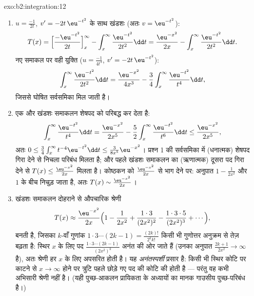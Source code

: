 \begin{solution}{exo:b2:integration:12}
\begin{enumerate}
  \item $u = \frac{-1}{2t}$, $v' = -2t\,\eu^{-t^2}$ के साथ खंडशः (अतः $v = \eu^{-t^2}$):
        \[
        T(x) = \Bigl[\frac{-\eu^{-t^2}}{2t}\Bigr]_x^\infty
        - \int_x^\infty \frac{\eu^{-t^2}}{2t^2}\dd t
        = \frac{\eu^{-x^2}}{2x}
        - \int_x^\infty \frac{\eu^{-t^2}}{2t^2}\dd t .
        \]
        नए समाकल पर वही युक्ति ($u = \frac{-1}{4t^3}$, $v' = -2t\,\eu^{-t^2}$):
        \[
        \int_x^\infty \frac{\eu^{-t^2}}{2t^2}\dd t
        = \frac{\eu^{-x^2}}{4x^3}
        - \frac34\int_x^\infty \frac{\eu^{-t^2}}{t^4}\dd t ,
        \]
        जिससे घोषित सर्वसमिका मिल जाती है।
  \item एक और खंडशः समाकलन शेषपद को परिबद्ध कर देता है:
        \[
        \int_x^\infty \frac{\eu^{-t^2}}{t^4}\dd t
        = \frac{\eu^{-x^2}}{2x^5}
        - \frac52\int_x^\infty\frac{\eu^{-t^2}}{t^6}\dd t
        \leq \frac{\eu^{-x^2}}{2x^5},
        \]
        अतः $0 \leq \frac34\int_x^\infty t^{-4}\eu^{-t^2}\dd t
        \leq \frac{3}{8x^5}\eu^{-x^2}$। प्रश्न 1 की सर्वसमिका में (धनात्मक) शेषपद गिरा देने से
        निचला परिबंध मिलता है; और पहले खंडशः समाकलन का (ऋणात्मक) दूसरा
        पद गिरा देने से $T(x) \leq \frac{\eu^{-x^2}}{2x}$ मिलता है। कोष्ठकन को $\frac{\eu^{-x^2}}{2x}$ से भाग देने पर:
        अनुपात $1 - \frac{1}{2x^2}$ और $1$ के बीच निचुड़ जाता है, अतः $T(x)
        \sim \frac{\eu^{-x^2}}{2x}$।
  \item खंडशः समाकलन दोहराने से औपचारिक श्रेणी
        \[
        T(x) \approx \frac{\eu^{-x^2}}{2x}\Bigl(1 -
        \frac{1}{2x^2} + \frac{1\cdot3}{(2x^2)^2} -
        \frac{1\cdot3\cdot5}{(2x^2)^3} + \cdots\Bigr),
        \]
        बनती है, जिसका $k$-वाँ गुणांक $1\cdot3\cdots(2k-1) =
        \frac{(2k)!}{2^k k!}$ किसी भी गुणोत्तर अनुक्रम से
        तेज़ बढ़ता है: स्थिर $x$ के लिए पद $\frac{1\cdot3\cdots(2k-1)}{(2x^2)^k}$ अनंत की ओर जाते हैं
        (उनका अनुपात $\frac{2k+1}{2x^2} \to \infty$ है), अतः श्रेणी हर $x$ के लिए अपसरित होती है।
        यह \emph{अनंतस्पर्शी} प्रसार है: किसी भी स्थिर कोटि पर काटने से
        $x \to \infty$ होने पर त्रुटि पहले छोड़े गए पद की कोटि की होती है ---
        परंतु वह कभी अभिसारी श्रेणी नहीं है। (यही पुच्छ-आकलन प्रायिकता
        के अध्यायों का मानक गाउसीय पुच्छ-परिबंध है।)
\end{enumerate}
\end{solution}

